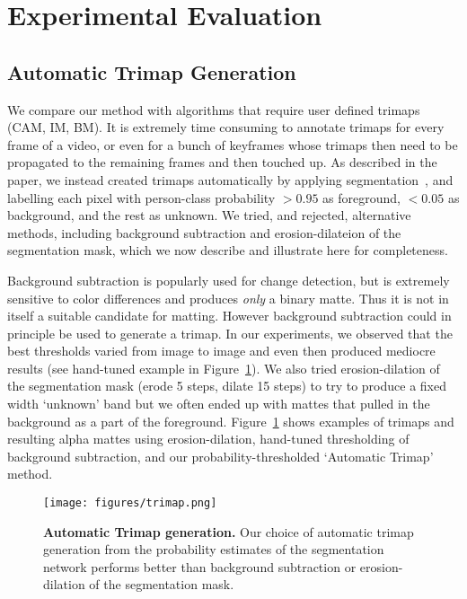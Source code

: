 \documentclass[10pt,twocolumn,letterpaper]{article}
\begin{document}
\section{Experimental Evaluation}

\subsection{Automatic Trimap Generation}
\label{sec:auto_tri}
We compare our method with algorithms that require user defined trimaps (CAM, IM, BM). It is extremely time consuming to annotate trimaps for every frame of a video, or even for a bunch of keyframes whose trimaps then need to be propagated to the remaining frames and then touched up. As described in the paper, we instead created trimaps automatically by applying segmentation~\cite{deeplabv3plus2018}, and labelling each pixel with person-class probability $>0.95$ as foreground, $<0.05$ as background, and the rest as unknown. We tried, and rejected, alternative methods, including background subtraction and erosion-dilateion of the segmentation mask, which we now describe and illustrate here for completeness.

Background subtraction is popularly used for change detection, but is extremely sensitive to color differences and produces \textit{only} a binary matte. Thus it is not in itself a suitable candidate for matting. However background subtraction could in principle be used to generate a trimap. In our experiments, we observed that the best thresholds varied from image to image and even then produced mediocre results (see hand-tuned example in Figure~\ref{fig:trimap}). We also tried erosion-dilation of the segmentation mask (erode 5 steps, dilate 15 steps) to try to produce a fixed width `unknown' band but we often ended up with mattes that pulled in the background as a part of the foreground. Figure~\ref{fig:trimap} shows examples of trimaps and resulting alpha mattes using erosion-dilation, hand-tuned thresholding of background subtraction, and our probability-thresholded `Automatic Trimap' method.

\begin{figure}[!ht]
	\centering
	\texttt{[image: figures/trimap.png]}    \caption{\small \textbf{Automatic Trimap generation.} Our choice of automatic trimap generation from the probability estimates of the segmentation network performs better than background subtraction or erosion-dilation of the segmentation mask.} 
\label{fig:trimap}
\end{figure}
\end{document}
